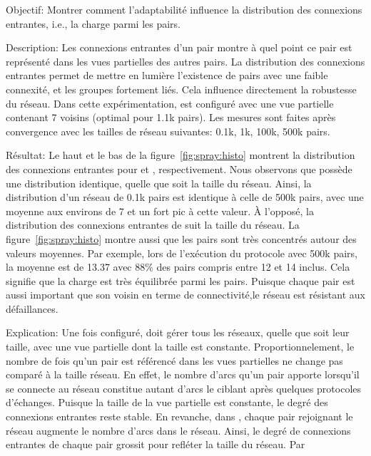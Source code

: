 \begin{asparadesc}
\item [Objectif:] Montrer comment l'adaptabilité influence la distribution des
  connexions entrantes, i.e., la charge parmi les pairs.
\item [Description:] Les connexions entrantes d'un pair montre à quel point ce
  pair est représenté dans les vues partielles des autres pairs. La distribution
  des connexions entrantes permet de mettre en lumière l'existence de pairs avec
  une faible connexité, et les groupes fortement liés. Cela influence
  directement la robustesse du réseau. Dans cette expérimentation, \CYCLON est
  configuré avec une vue partielle contenant 7 voisins (optimal pour 1.1k
  pairs). Les mesures sont faites après convergence avec les tailles de réseau
  suivantes: 0.1k, 1k, 100k, 500k pairs.
\item [Résultat:] Le haut et le bas de la figure~\ref{fig:spray:histo} montrent
  la distribution des connexions entrantes pour \CYCLON et \SPRAY,
  respectivement. Nous observons que \CYCLON possède une distribution identique,
  quelle que soit la taille du réseau. Ainsi, la distribution d'un réseau de
  0.1k pairs est identique à celle de 500k pairs, avec une moyenne aux environs
  de 7 et un fort pic à cette valeur. À l'opposé, la distribution des connexions
  entrantes de \SPRAY suit la taille du réseau. La figure~\ref{fig:spray:histo}
  montre aussi que les pairs sont très concentrés autour des valeurs
  moyennes. Par exemple, lors de l'exécution du protocole \SPRAY avec 500k
  pairs, la moyenne est de 13.37 avec 88\% des pairs compris entre 12 et 14
  inclus. Cela signifie que la charge est très équilibrée parmi les
  pairs. Puisque chaque pair est aussi important que son voisin en terme de
  connectivité,le réseau est résistant aux défaillances.
\item [Explication:] Une fois configuré, \CYCLON doit gérer tous les réseaux,
  quelle que soit leur taille, avec une vue partielle dont la taille est
  constante. Proportionnelement, le nombre de fois qu'un pair est référencé dans
  les vues partielles ne change pas comparé à la taille réseau. En effet, le
  nombre d'arcs qu'un pair apporte lorsqu'il se connecte au réseau constitue
  autant d'arcs le ciblant après quelques protocoles d'échanges. Puisque la
  taille de la vue partielle est constante, le degré des connexions entrantes
  reste stable. En revanche, dans \SPRAY, chaque pair rejoignant le réseau
  augmente le nombre d'arcs dans le réseau. Ainsi, le degré de connexions
  entrantes de chaque pair grossit pour refléter la taille du réseau. Par

\end{asparadesc}
